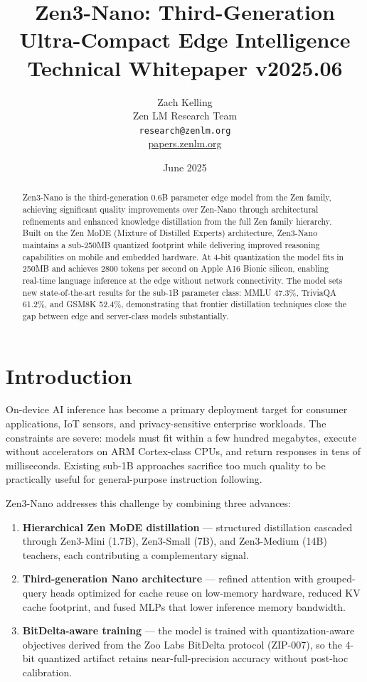 \documentclass[11pt,a4paper]{article}
\title{\textbf{Zen3-Nano: Third-Generation Ultra-Compact Edge Intelligence}\\
\large Technical Whitepaper v2025.06}
\author{Zach Kelling \\ Zen LM Research Team\\
\texttt{research@zenlm.org}\\
\href{https://papers.zenlm.org}{papers.zenlm.org}}
\date{June 2025}
\begin{document}
\maketitle

\begin{abstract}
Zen3-Nano is the third-generation 0.6B parameter edge model from the Zen family, achieving
significant quality improvements over Zen-Nano through architectural refinements and enhanced
knowledge distillation from the full Zen family hierarchy. Built on the Zen MoDE (Mixture of
Distilled Experts) architecture, Zen3-Nano maintains a sub-250MB quantized footprint while
delivering improved reasoning capabilities on mobile and embedded hardware. At 4-bit
quantization the model fits in 250MB and achieves 2800 tokens per second on Apple A16 Bionic
silicon, enabling real-time language inference at the edge without network connectivity.
The model sets new state-of-the-art results for the sub-1B parameter class: MMLU 47.3\%,
TriviaQA 61.2\%, and GSM8K 52.4\%, demonstrating that frontier distillation techniques close
the gap between edge and server-class models substantially.
\end{abstract}

\tableofcontents
\newpage

\section{Introduction}
\label{sec:intro}

On-device AI inference has become a primary deployment target for consumer applications,
IoT sensors, and privacy-sensitive enterprise workloads. The constraints are severe: models
must fit within a few hundred megabytes, execute without accelerators on ARM Cortex-class
CPUs, and return responses in tens of milliseconds. Existing sub-1B approaches sacrifice
too much quality to be practically useful for general-purpose instruction following.

Zen3-Nano addresses this challenge by combining three advances:

\begin{enumerate}
\item \textbf{Hierarchical Zen MoDE distillation} --- structured distillation cascaded through
      Zen3-Mini (1.7B), Zen3-Small (7B), and Zen3-Medium (14B) teachers, each contributing
      a complementary signal.
\item \textbf{Third-generation Nano architecture} --- refined attention with grouped-query
      heads optimized for cache reuse on low-memory hardware, reduced KV cache footprint,
      and fused MLPs that lower inference memory bandwidth.
\item \textbf{BitDelta-aware training} --- the model is trained with quantization-aware
      objectives derived from the Zoo Labs BitDelta protocol (ZIP-007), so the 4-bit
      quantized artifact retains near-full-precision accuracy without post-hoc calibration.
\end{enumerate}
\end{document}
